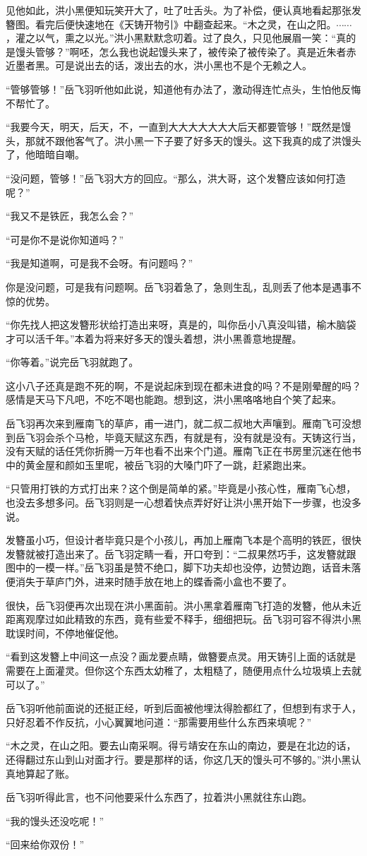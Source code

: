 见他如此，洪小黑便知玩笑开大了，吐了吐舌头。为了补偿，便认真地看起那张发簪图。看完后便快速地在《天铸开物引》中翻查起来。“木之灵，在山之阳。$\cdots\cdots$，灌之以气，熏之以光。”洪小黑默默念叨着。过了良久，只见他展眉一笑：“真的是馒头管够？”啊呸，怎么我也说起馒头来了，被传染了被传染了。真是近朱者赤近墨者黑。可是说出去的话，泼出去的水，洪小黑也不是个无赖之人。

“管够管够！”岳飞羽听他如此说，知道他有办法了，激动得连忙点头，生怕他反悔不帮忙了。

“我要今天，明天，后天，不，一直到大大大大大大大后天都要管够！”既然是馒头，那就不跟他客气了。洪小黑一下子要了好多天的馒头。这下我真的成了洪馒头了，他暗暗自嘲。

“没问题，管够！”岳飞羽大方的回应。“那么，洪大哥，这个发簪应该如何打造呢？”

“我又不是铁匠，我怎么会？”

“可是你不是说你知道吗？”

“我是知道啊，可是我不会呀。有问题吗？”

你是没问题，可是我有问题啊。岳飞羽着急了，急则生乱，乱则丢了他本是遇事不惊的优势。

“你先找人把这发簪形状给打造出来呀，真是的，叫你岳小八真没叫错，榆木脑袋才可以活千年。”本着为将来好多天的馒头着想，洪小黑善意地提醒。

“你等着。”说完岳飞羽就跑了。

这小八子还真是跑不死的啊，不是说起床到现在都未进食的吗？不是刚晕醒的吗？感情是天马下凡吧，不吃不喝也能跑。想到这，洪小黑咯咯地自个笑了起来。

岳飞羽再次来到雁南飞的草庐，甫一进门，就二叔二叔地大声嚷到。雁南飞可没想到岳飞羽会杀个马枪，毕竟天赋这东西，有就是有，没有就是没有。天铸这行当，没有天赋的话任凭你折腾一万年也看不出来个门道。雁南飞正在书房里沉迷在他书中的黄金屋和颜如玉里呢，被岳飞羽的大嗓门吓了一跳，赶紧跑出来。

“只管用打铁的方式打出来？这个倒是简单的紧。”毕竟是小孩心性，雁南飞心想，也没去多想多问。岳飞羽则是一心想着快点弄好好让洪小黑开始下一步骤，也没多说。

发簪虽小巧，但设计者毕竟只是个小孩儿，再加上雁南飞本是个高明的铁匠，很快发簪就被打造出来了。岳飞羽定睛一看，开口夸到：“二叔果然巧手，这发簪就跟图中的一模一样。”岳飞羽虽是赞不绝口，脚下功夫却也没停，边赞边跑，话音未落便消失于草庐门外，进来时随手放在地上的蝶香斋小盒也不要了。

很快，岳飞羽便再次出现在洪小黑面前。洪小黑拿着雁南飞打造的发簪，他从未近距离观摩过如此精致的东西，竟有些爱不释手，细细把玩。岳飞羽可容不得洪小黑耽误时间，不停地催促他。

“看到这发簪上中间这一点没？画龙要点睛，做簪要点灵。用天铸引上面的话就是需要在上面灌灵。但你这个东西太幼稚了，太粗糙了，随便用点什么垃圾填上去就可以了。”

岳飞羽听他前面说的还挺正经，听到后面被他埋汰得脸都红了，但想到有求于人，只好忍着不作反抗，小心翼翼地问道：“那需要用些什么东西来填呢？”

“木之灵，在山之阳。要去山南采啊。得亏靖安在东山的南边，要是在北边的话，还得翻过东山到山对面才行。要是那样的话，你这几天的馒头可不够的。”洪小黑认真地算起了账。

岳飞羽听得此言，也不问他要采什么东西了，拉着洪小黑就往东山跑。

“我的馒头还没吃呢！”

“回来给你双份！”